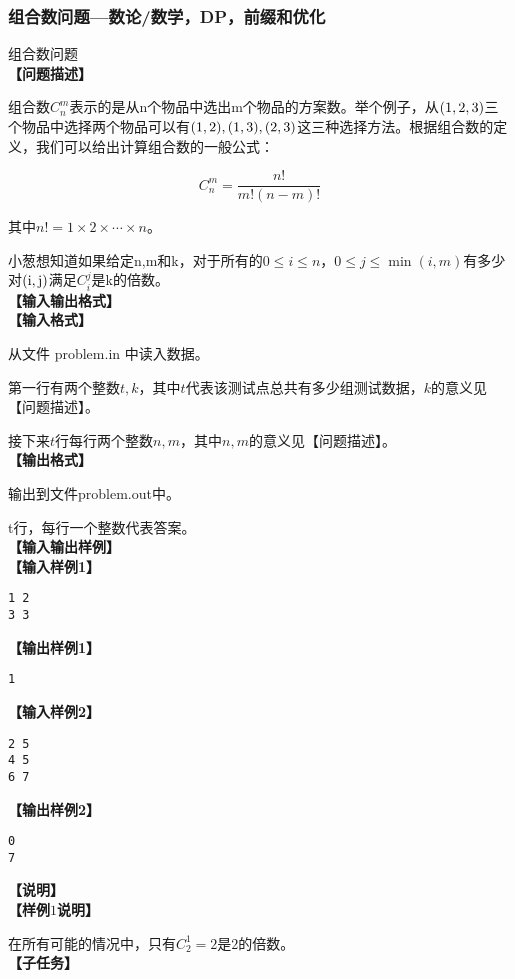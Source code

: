 	\subsubsection{组合数问题---数论/数学，DP，前缀和优化}
	\begin{example} 组合数问题\\
		\textbf{【问题描述】}

		组合数$C_n^m$表示的是从n个物品中选出m个物品的方案数。举个例子，从$\rm (1,2,3)$三个物品中选择两个物品可以有$\rm (1,2),(1,3),(2,3)$这三种选择方法。根据组合数的定义，我们可以给出计算组合数的一般公式：

		\begin{equation*}C_n^m=\frac{n!}{m!(n - m)!}\end{equation*}

		其中$n!=1\times 2\times\cdots\times n$。

		小葱想知道如果给定n,m和k，对于所有的$0\leq i\leq n$，$0\leq j\leq\min(i,m)$有多少对$\rm (i,j)$满足$C_i^j$是k的倍数。\\
		\textbf{【输入输出格式】}\\
		\textbf{【输入格式】}

		从文件 problem.in 中读入数据。

		第一行有两个整数$t,k$，其中$t$代表该测试点总共有多少组测试数据，$k$的意义见 【问题描述】。

		接下来$t$行每行两个整数$n, m$，其中$n, m$的意义见【问题描述】。 \\
		\textbf{【输出格式】}

		输出到文件problem.out中。

		t行，每行一个整数代表答案。\\
		\textbf{【输入输出样例】}\\
		\textbf{【输入样例1】}
		\begin{verbatim}
1 2
3 3
\end{verbatim}
		\textbf{【输出样例1】}
		\begin{verbatim}
1
\end{verbatim}
		\textbf{【输入样例2】}
		\begin{verbatim}
2 5
4 5
6 7
\end{verbatim}
		\textbf{【输出样例2】}
		\begin{verbatim}
0
7
\end{verbatim}
		\textbf{【说明】}\\
		\textbf{【样例$1$说明】}

		在所有可能的情况中，只有$C_2^1 = 2$是$2$的倍数。\\
		\textbf{【子任务】}


\end{example}

